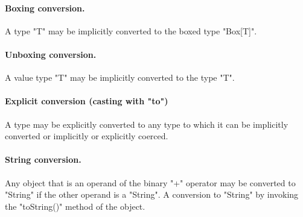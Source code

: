 
\paragraph{Boxing conversion.}
A type \xcd"T" may be implicitly converted to the
boxed type \xcd"Box[T]".


\paragraph{Unboxing conversion.}
A value type \xcd"T" may be implicitly converted to the
type \xcd"T".


\paragraph{Explicit conversion (casting with \xcd"to")}
A type may be explicitly converted to any type to which it can be
implicitly converted or implicitly or explicitly coerced.


\paragraph{String conversion.}
Any object that is an operand of the binary
\xcd"+" operator may
be converted to \xcd"String" if the other operand is a \xcd"String".
A conversion to \xcd"String" by invoking the \xcd"toString()"
method of the object.


